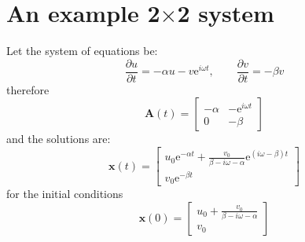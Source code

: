 \documentclass{article}
\begin{document}
\newpage
\section*{An example 2$\times$2 system}
Let the system of equations be:
\begin{equation}
 \frac{\partial{u}}{\partial{t}}=-\alpha u-v\mathrm{e}^{i\omega{t}},
 \qquad \frac{\partial{v}}{\partial{t}}=-\beta{} v
 \label{eq:example}
\end{equation}
therefore
\begin{equation}
 \mathbf{A}(t)=
 \begin{bmatrix*}
  -\alpha & -\mathrm{e}^{i\omega{t}} \\
  0 & -\beta
 \end{bmatrix*} %
\end{equation}
and the solutions are:
\begin{equation}
 \mathbf{x}(t)=
 \begin{bmatrix*}
  u_0\mathrm{e}^{-\alpha{t}}+\frac{v_0}{\beta-i\omega-\alpha}\mathrm{e}^{(i\omega-\beta){t}} \\
  v_0\mathrm{e}^{-\beta{t}}
 \end{bmatrix*}
 \label{eq:analytical_soln}
\end{equation}
for the initial conditions
\begin{equation}
 \mathbf{x}(0)=
 \begin{bmatrix*}
  u_0+\frac{v_0}{\beta-i\omega-\alpha} \\
  v_0
 \end{bmatrix*}
\end{equation}
\end{document}
